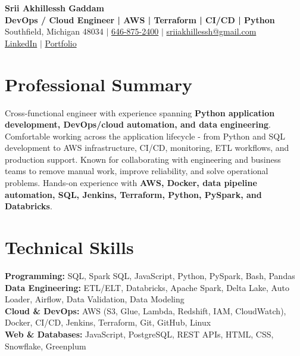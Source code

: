 \documentclass[letterpaper,10pt]{article}
\begin{document}
\fontsize{9.35pt}{10.45pt}\selectfont

\begin{center}
    {\LARGE \textbf{Srii Akhillessh Gaddam}} \\[-1pt]
    \textbf{DevOps / Cloud Engineer | AWS | Terraform | CI/CD | Python} \\[2pt]
    Southfield, Michigan 48034 $|$
    \href{tel:6468752400}{646-875-2400} $|$
    \href{mailto:sriiakhillessh@gmail.com}{sriiakhillessh@gmail.com} \\[1pt]
    \href{https://www.linkedin.com/in/srii-akhiilessh-gaddam-b48668191/}{LinkedIn} $|$
    \href{https://sriiakhillesshg.github.io/portfolio/}{Portfolio}
\end{center}
\vspace{-8pt}

\section{Professional Summary}
\small{Cross-functional engineer with experience spanning \textbf{Python application development, DevOps/cloud automation, and data engineering}. Comfortable working across the application lifecycle - from Python and SQL development to AWS infrastructure, CI/CD, monitoring, ETL workflows, and production support. Known for collaborating with engineering and business teams to remove manual work, improve reliability, and solve operational problems. Hands-on experience with \textbf{AWS, Docker, data pipeline automation, SQL, Jenkins, Terraform, Python, PySpark, and Databricks}.}

\section{Technical Skills}
\small{
\textbf{Programming:} SQL, Spark SQL, JavaScript, Python, PySpark, Bash, Pandas \\
\textbf{Data Engineering:} ETL/ELT, Databricks, Apache Spark, Delta Lake, Auto Loader, Airflow, Data Validation, Data Modeling \\
\textbf{Cloud \& DevOps:} AWS (S3, Glue, Lambda, Redshift, IAM, CloudWatch), Docker, CI/CD, Jenkins, Terraform, Git, GitHub, Linux \\
\textbf{Web \& Databases:} JavaScript, PostgreSQL, REST APIs, HTML, CSS, Snowflake, Greenplum
}
\end{document}
